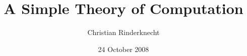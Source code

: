 \documentclass[compress,dvips,xcolor={dvipsnames},t]{beamer}
\title{A Simple Theory of Computation}
\author{Christian Rinderknecht}
\date{24 October 2008}
\begin{document}
\frame{\maketitle}







\end{document}
